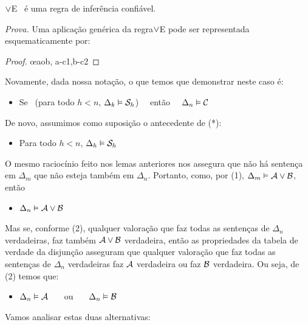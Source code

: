 \begin{factoidboxe}
	$\vee$E \ é uma regra de inferência confiável.
\end{factoidboxe}
\noindent\emph{Prova.}
Uma aplicação genérica da regra$\vee$E pode ser representada esquematicamente por:
   \begin{proof}
	   \open
	   \close
	   \open
	   \close
	   \oe{aob, a-c1,b-c2}
   \end{proof}\noindent
Novamente, dada nossa notação, o que temos que demonstrar neste caso é:   
	\begin{itemize}
		\item[(*)]  Se  \ ({para todo}  $h<n$, $\Delta_k \vDash \mathcal{S}_h$) \ \ então \ \ $\Delta_n \vDash \mathcal{C}$
	\end{itemize}   
De novo, assumimos como suposição o antecedente de (*):
	\begin{itemize}
		\item[(1)] Para todo  $h<n$, $\Delta_h \vDash \mathcal{S}_h$
	\end{itemize}
O mesmo raciocínio feito nos lemas anteriores nos assegura que não há sentença em $\Delta_m$ que não esteja também em $\Delta_n$.
Portanto, como, por (1), $\Delta_m \vDash \mathcal{A} \vee \mathcal{B}$, então
	\begin{itemize}
		\item[(2)] $\Delta_n \vDash \mathcal{A} \vee \mathcal{B}$
	\end{itemize}
Mas se, conforme (2), qualquer valoração que faz todas as sentenças de $\Delta_{n}$ verdadeiras, faz também $\mathcal{A} \vee \mathcal{B}$ verdadeira, então as propriedades da tabela de verdade da disjunção asseguram que qualquer valoração que faz todas as sentenças de  $\Delta_{n}$ verdadeiras faz $\mathcal{A}$ verdadeira ou faz $\mathcal{B}$ verdadeira. Ou seja, de (2) temos que:
	\begin{itemize}
		\item[(3)] $\Delta_n \vDash \mathcal{A}$ \ \ \ ou \ \ \ $\Delta_n \vDash \mathcal{B}$
	\end{itemize}
Vamos analisar estas duas alternativas:
